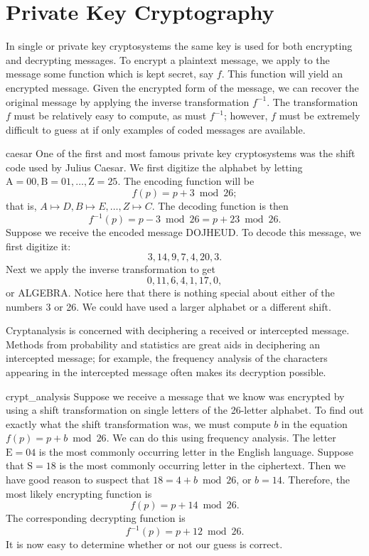 \section{Private Key Cryptography}
 
In {\bfi single\/} or
{\bfi private key
cryptosystems\/}
the same key is used for both encrypting and decrypting messages. To
encrypt a  plaintext message, we apply to the message some function
which is kept secret, say $f$. This function will yield an encrypted
message.  Given the encrypted form of the message, we can recover the
original message by applying the inverse transformation $f^{-1}$. The
transformation $f$ must be relatively easy to compute, as must
$f^{-1}$; however, $f$ must be extremely difficult to guess at if only
examples of coded messages are available.
 
\begin{example}{caesar}
One of the first and most famous private key cryptosystems was the
shift code used by Julius Caesar.  We first digitize the alphabet by
letting $\mbox{A}  = 00, \mbox{B}  = 01, \ldots, \mbox{Z} = 25$.
The encoding function will be 
\[
f(p) = p + 3 \bmod 26;
\]
that is, $A \mapsto D, B \mapsto E, \ldots, Z \mapsto C$. The decoding
function is then 
\[
f^{-1}(p) = p - 3 \bmod 26 = p + 23 \bmod 26.
\]
Suppose we receive the encoded message DOJHEUD. To decode this
message, we first digitize it:  
\[
3, 14, 9, 7, 4, 20, 3.
\]
Next we apply the inverse transformation to get
\[
0, 11, 6, 4, 1, 17, 0,
\]
or ALGEBRA. Notice here that there is nothing special about either of
the numbers 3 or 26. We could have used a larger alphabet or a
different shift.
\mbox{\hspace{1in}}
\end{example}

 
{\bfi Cryptanalysis\/} is concerned with
deciphering a received or intercepted message. Methods from
probability and statistics are great aids in deciphering an
intercepted message; for example, the frequency analysis of the
characters appearing in the intercepted message often makes its
decryption possible.  
 
 
\begin{example}{crypt_analysis}
Suppose we receive a message that we know was encrypted by using a
shift transformation on single letters of the 26-letter alphabet. To
find out exactly what the shift transformation was, we must compute
$b$ in the equation $f(p) = p + b \bmod 26$. We can do this using
frequency analysis.  The letter $\mbox{E} = 04$ is the most commonly
occurring letter in the English language. Suppose that $\mbox{S} = 18$
is the most commonly occurring letter in the ciphertext.  Then we have
good reason to suspect that  $18 = 4 + b \bmod 26$, or $b= 14$.
Therefore, the most likely encrypting function is
\[
f(p) = p + 14 \bmod 26.
\]
The corresponding decrypting function is
\[
f^{-1}(p) = p + 12 \bmod 26.
\]
It is now easy to determine whether or not our guess is correct.
\end{example}
 
